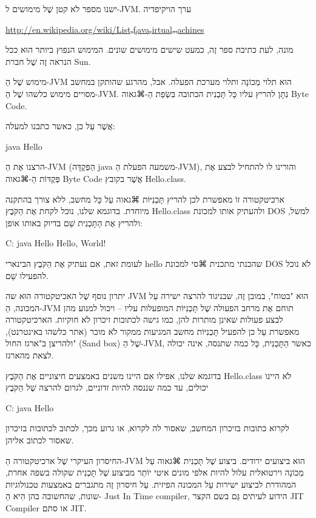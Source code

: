 ישנו מספר לֹא קטן שֶׁל מימושים ל-JVM. ערך הויקיפדיה
\begin{english}
\url{http://en.wikipedia.org/wiki/Listₒfⱼavaᵥirtualₘachines}
\end{english}

מונה, לעת כתיבת ספר זֶה, כמעט שישים מימושים שונים. המימוש הנפוץ ביותר הוּא ככל
הנראה זֶה שֶׁל חברת Sun.

מימוש שֶׁל הַ-JVM הוּא תלוי מְכוֹנָה ותלוי מערכת הפעלה. אבל, מהרגע שהותקן במחשב
מסויים מימוש כלשהו שֶׁל הַ-JVM. נִתָּן להריץ עליו כָּל תָּכְנִית הכתובה
בִּשְׂפַת הַ-⌘גאוה Byte Code.

אֲשֶׁר עַל כן, כאשר כתבנו למעלה:

java Hello
\END

הרצנו אֶת הַ-JVM (הַפְּקֻדָּה java משמעה הפעלת הַ-JVM), והורינו לו להתחיל לבצע
אֶת פְּקֻדּוֹת הַ-⌘גאוה Byte Code אֲשֶׁר בקובץ Hello.class.

ארכיטקטורה זוֹ מאפשרת לכן להריץ תָּכְנִיּוֹת ⌘גאוה עַל כָּל מחשב, ללא צורך בהתקנה
מיוחדת. בדוגמא שלנו, נוכל לקחת אֶת הַקֹּבֶץ Hello.class ולהעתיק אותו למכונת DOS
למשל, ולהריץ אֶת הַתָּכְנִית שֵׁם בדיוק באותו אופן:

\begin{NONE}
C:\> java Hello
Hello, World!
\end{NONE}

לעומת זאת, אִם נעתיק אֶת הַקֹּבֶץ הבינארי hello שהכנתי מתכנית ⌘סי למכונת DOS לֹא
נוכל להפעילו שֵׁם.

יתרון נוסף שֶׁל האכיטקטורה הוּא שה JVM הוּא "בטוח", במובן זֶה, שבניגוד להרצה
ישירה עַל המכונה, הַ-JVM תוחם אֶת מרחב הפעולה שֶׁל תָּכְנִיּוֹת המופעלות עליו –
ויכול למנוע מהן לבצע פעולות שאינן מותרות להן, כמו גישה לכתובות זיכרון לֹא
חוקיות. הארכיטקטורה מאפשרת עַל כן להפעיל תָּכְנִיּוֹת מחשב המגיעות ממקור לֹא
מוכר (אתר כלשהו באינטרנט), ולהריצן ב"ארגז החול" (Sand box) שֶׁל הַ-JVM, כאשר
הַתָּכְנִית, כָּל כמה שתנסה, אינה יכולה לצאת מהארגז.

בדוגמא שלנו, אפילו אִם היינו משנים באמצעים חיצוניים אֶת הַקֹּבֶץ Hello.class לֹא
היינו יכולים, עד כמה שננסה להיות זדוניים, לגרום להרצה שֶׁל הַקֹּבֶץ
\begin{NONE}
C:\> java Hello
\end{NONE}

לקרוא כתובות בזיכרון המחשב, שאסור לה לקרוא, או גרוע מכך, לכתוב לכתובות בזיכרון
שאסור לכתוב אליהן.

החיסרון העיקרי שֶׁל ארכיטקטורה הַ-JVM הוּא ביצועים ירודים. ביצוע שֶׁל תָּכְנִית
⌘גאוה עַל מְכוֹנָה וירטואלית עלול להיות אלפי מונים איטי יוֹתֵר מביצוע שֶׁל
תָּכְנִית שקולה בשפה אחרת, המהודרת לביצוע ישירות עַל המכונה הפיזית. עַל חיסרון
זֶה מתגברים באמצעות טכנולוגיות שונות, שהחשובה בהן הִיא הַ- Just In Time
compiler, הידוע לעיתים גַּם בשם הקצר JIT Compiler או סתם JIT.

